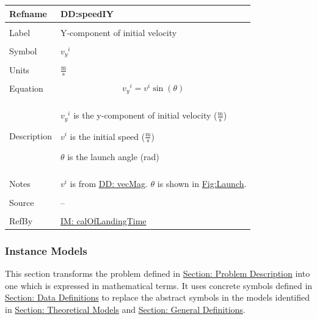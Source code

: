 \documentclass[12pt]{article}
\begin{document}
\noindent \begin{minipage}{\textwidth}
\begin{tabular}{p{} p{}}
\toprule \textbf{Refname} & \textbf{DD:speedIY}
\label{DD:speedIY}
\\ \midrule \\
Label & Y-component of initial velocity
\\ \midrule \\
Symbol & ${{v_{y}}^{i}}$
\\ \midrule \\
Units & $\frac{\text{m}}{\text{s}}$
\\ \midrule \\
Equation & \begin{displaymath}
           {{v_{y}}^{i}}={v^{i}} \sin\left(θ\right)
           \end{displaymath}
\\ \midrule \\
Description & \begin{symbDescription}
              \item{${{v_{y}}^{i}}$ is the y-component of initial velocity ($\frac{\text{m}}{\text{s}}$)}
              \item{${v^{i}}$ is the initial speed ($\frac{\text{m}}{\text{s}}$)}
              \item{$θ$ is the launch angle (rad)}
              \end{symbDescription}
\\ \midrule \\
Notes & ${v^{i}}$ is from \hyperref[DD:vecMag]{DD: vecMag}.
        $θ$ is shown in \hyperref[Figure:Launch]{Fig:Launch}.
\\ \midrule \\
Source & --
\\ \midrule \\
RefBy & \hyperref[IM:calOfLandingTime]{IM: calOfLandingTime}
\\ \bottomrule \end{tabular}
\end{minipage}
\subsubsection{Instance Models}
\label{Sec:IMs}
This section transforms the problem defined in \hyperref[Sec:ProbDesc]{Section: Problem Description} into one which is expressed in mathematical terms. It uses concrete symbols defined in \hyperref[Sec:DDs]{Section: Data Definitions} to replace the abstract symbols in the models identified in \hyperref[Sec:TMs]{Section: Theoretical Models} and \hyperref[Sec:GDs]{Section: General Definitions}.
\par~
\end{document}
